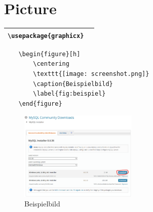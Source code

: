 \section{Picture}

\begin{tabular}{|p{}|p{}|}
    \hline
    \texttt{\textbackslash usepackage\{graphicx\}} &  \\
    \hline
\end{tabular}

\begin{verbatim}
    \begin{figure}[h]
        \centering
        \texttt{[image: screenshot.png]}
        \caption{Beispielbild}
        \label{fig:beispiel}
    \end{figure}      
\end{verbatim}

\begin{figure}[h]
    \centering
    \includegraphics[width=0.5\textwidth]{pics/screenshot.png}
    \caption{Beispielbild}
    \label{fig:beispiel}
\end{figure}
  
